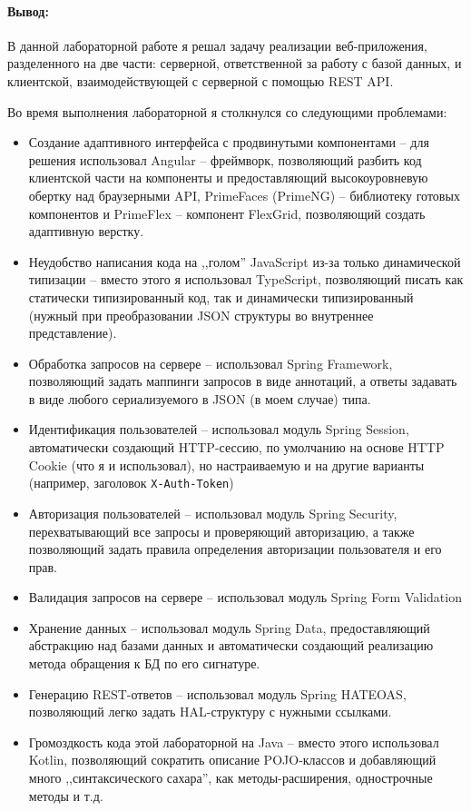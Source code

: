 \newpage
\paragraph{Вывод:}

В данной лабораторной работе я решал задачу реализации веб-приложения, разделенного на две части:
серверной, ответственной за работу с базой данных,
и клиентской, взаимодействующей с серверной с помощью REST API\@.

Во время выполнения лабораторной я столкнулся со следующими проблемами:
\begin{itemize}
    \item Создание адаптивного интерфейса с продвинутыми компонентами -- для решения использовал
    Angular -- фреймворк, позволяющий разбить код клиентской части на компоненты и предоставляющий
    высокоуровневую обертку над браузерными API,
    PrimeFaces (PrimeNG) -- библиотеку готовых компонентов
    и PrimeFlex -- компонент FlexGrid, позволяющий создать адаптивную верстку.
    \item Неудобство написания кода на ,,голом'' JavaScript из-за только динамической типизации --
    вместо этого я использовал TypeScript, позволяющий писать как статически типизированный код,
    так и динамически типизированный (нужный при преобразовании JSON структуры во внутреннее представление).

    \item Обработка запросов на сервере -- использовал Spring Framework,
    позволяющий задать маппинги запросов в виде аннотаций, а ответы задавать в виде любого сериализуемого в JSON
    (в моем случае) типа.
    \item Идентификация пользователей -- использовал модуль Spring Session, автоматически создающий HTTP-сессию,
    по умолчанию на основе HTTP Cookie (что я и использовал), но настраиваемую и на другие варианты
    (например, заголовок \texttt{X-Auth-Token})
    \item Авторизация пользователей -- использовал модуль Spring Security, перехватывающий все запросы и проверяющий
    авторизацию, а также позволяющий задать правила определения авторизации пользователя и его прав.
    \item Валидация запросов на сервере -- использовал модуль Spring Form Validation
    \item Хранение данных -- использовал модуль Spring Data, предоставляющий абстракцию над базами данных и
    автоматически создающий реализацию метода обращения к БД по его сигнатуре.
    \item Генерацию REST-ответов -- использовал модуль Spring HATEOAS, позволяющий легко задать HAL-структуру с
    нужными ссылками.

    \item Громоздкость кода этой лабораторной на Java -- вместо этого использовал Kotlin, позволяющий сократить
    описание POJO-классов и добавляющий много ,,синтаксического сахара'', как методы-расширения, однострочные методы и т.д.
\end{itemize}
